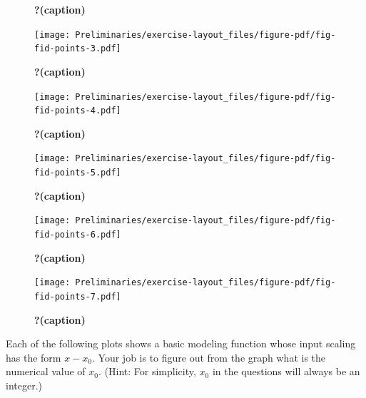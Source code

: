 \documentclass[
  letterpaper,
  DIV=11,
  numbers=noendperiod,
  oneside]{article}
\begin{document}
\begin{multicols}{2}
\begin{figure}
\caption{\label{fig-fid-points-2}\textbf{?(caption)}}

\end{figure}

\begin{figure}

{\centering \texttt{[image: Preliminaries/exercise-layout\_files/figure-pdf/fig-fid-points-3.pdf]}

}

\caption{\label{fig-fid-points-3}\textbf{?(caption)}}

\end{figure}

\begin{figure}

{\centering \texttt{[image: Preliminaries/exercise-layout\_files/figure-pdf/fig-fid-points-4.pdf]}

}

\caption{\label{fig-fid-points-4}\textbf{?(caption)}}

\end{figure}

\begin{figure}

{\centering \texttt{[image: Preliminaries/exercise-layout\_files/figure-pdf/fig-fid-points-5.pdf]}

}

\caption{\label{fig-fid-points-5}\textbf{?(caption)}}

\end{figure}

\begin{figure}

{\centering \texttt{[image: Preliminaries/exercise-layout\_files/figure-pdf/fig-fid-points-6.pdf]}

}

\caption{\label{fig-fid-points-6}\textbf{?(caption)}}

\end{figure}

\begin{figure}

{\centering \texttt{[image: Preliminaries/exercise-layout\_files/figure-pdf/fig-fid-points-7.pdf]}

}

\caption{\label{fig-fid-points-7}\textbf{?(caption)}}

\end{figure}

Each of the following plots shows a basic modeling function whose input
scaling has the form \(x - x_0\). Your job is to figure out from the
graph what is the numerical value of \(x_0\). (Hint: For simplicity,
\(x_0\) in the questions will always be an integer.)


\end{multicols}
\end{document}
